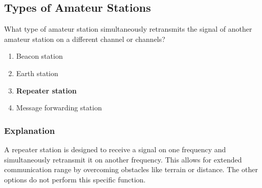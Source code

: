 \subsection{Types of Amateur Stations}
\label{T1F09}

\begin{tcolorbox}[colback=gray!10!white,colframe=black!75!black,title=T1F09]
What type of amateur station simultaneously retransmits the signal of another amateur station on a different channel or channels?
\begin{enumerate}[label=\Alph*,noitemsep]
    \item Beacon station
    \item Earth station
    \item \textbf{Repeater station}
    \item Message forwarding station
\end{enumerate}
\end{tcolorbox}

\subsubsection*{Explanation}
A repeater station is designed to receive a signal on one frequency and simultaneously retransmit it on another frequency. This allows for extended communication range by overcoming obstacles like terrain or distance. The other options do not perform this specific function.